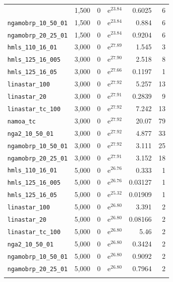 \begin{longtable}{|l|r|r|r|r|r|}
{    \texttt{nga2\_10\_50\_01} & 1,500 & 0 & $\mathrm{e}^{23.84}$ & 0.6025 & 6 \\
    \texttt{ngamobrp\_10\_50\_01} & 1,500 & 0 & $\mathrm{e}^{23.84}$ & 0.884 & 6 \\
    \texttt{ngamobrp\_20\_25\_01} & 1,500 & 0 & $\mathrm{e}^{23.84}$ & 0.9204 & 6 \\
    \texttt{hmls\_110\_16\_01} & 3,000 & 0 & $\mathrm{e}^{27.89}$ & 1.545 & 3 \\
    \texttt{hmls\_125\_16\_005} & 3,000 & 0 & $\mathrm{e}^{27.90}$ & 2.518 & 8 \\
    \texttt{hmls\_125\_16\_05} & 3,000 & 0 & $\mathrm{e}^{27.66}$ & 0.1197 & 1 \\
    \texttt{linastar\_100} & 3,000 & 0 & $\mathrm{e}^{27.92}$ & 5.257 & 13 \\
    \texttt{linastar\_20} & 3,000 & 0 & $\mathrm{e}^{27.91}$ & 0.2839 & 9 \\
    \texttt{linastar\_tc\_100} & 3,000 & 0 & $\mathrm{e}^{27.92}$ & 7.242 & 13 \\
    \texttt{namoa\_tc} & 3,000 & 0 & $\mathrm{e}^{27.92}$ & 20.07 & 79 \\
    \texttt{nga2\_10\_50\_01} & 3,000 & 0 & $\mathrm{e}^{27.92}$ & 4.877 & 33 \\
    \texttt{ngamobrp\_10\_50\_01} & 3,000 & 0 & $\mathrm{e}^{27.92}$ & 3.111 & 25 \\
    \texttt{ngamobrp\_20\_25\_01} & 3,000 & 0 & $\mathrm{e}^{27.91}$ & 3.152 & 18 \\
    \texttt{hmls\_110\_16\_01} & 5,000 & 0 & $\mathrm{e}^{26.76}$ & 0.333 & 1 \\
    \texttt{hmls\_125\_16\_005} & 5,000 & 0 & $\mathrm{e}^{26.76}$ & 0.03127 & 1 \\
    \texttt{hmls\_125\_16\_05} & 5,000 & 0 & $\mathrm{e}^{25.32}$ & 0.01909 & 1 \\
    \texttt{linastar\_100} & 5,000 & 0 & $\mathrm{e}^{26.80}$ & 3.391 & 2 \\
    \texttt{linastar\_20} & 5,000 & 0 & $\mathrm{e}^{26.80}$ & 0.08166 & 2 \\
    \texttt{linastar\_tc\_100} & 5,000 & 0 & $\mathrm{e}^{26.80}$ & 5.46 & 2 \\
    \texttt{nga2\_10\_50\_01} & 5,000 & 0 & $\mathrm{e}^{26.80}$ & 0.3424 & 2 \\
    \texttt{ngamobrp\_10\_50\_01} & 5,000 & 0 & $\mathrm{e}^{26.80}$ & 0.9092 & 2 \\
    \texttt{ngamobrp\_20\_25\_01} & 5,000 & 0 & $\mathrm{e}^{26.80}$ & 0.7964 & 2 \\
}
\end{longtable}
